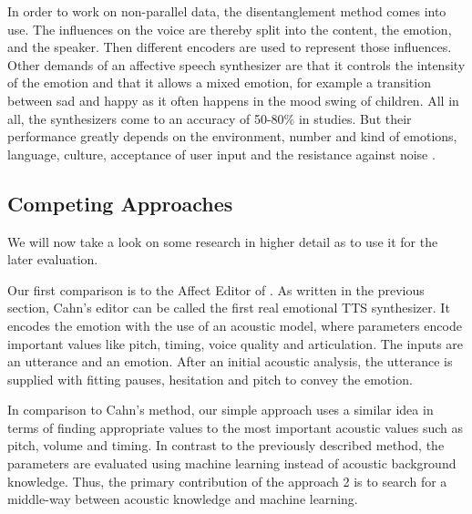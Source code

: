 \documentclass[11pt]{article}
\begin{document}
In order to work on non-parallel data, the disentanglement method comes into use. The influences on the voice are thereby split into the content, the emotion, and the speaker. Then different encoders are used to represent those influences.
Other demands of an affective speech synthesizer are that it controls the intensity of the emotion and that it allows a mixed emotion, for example a transition between sad and happy as it often happens in the mood swing of children. All in all, the synthesizers come to an accuracy of 50-80\% in studies. But their performance greatly depends on the environment, number and kind of emotions, language, culture, acceptance of user input and the resistance against noise \cite{triantafyllopoulos_overview_2023}.


\subsection{Competing Approaches}
\label{competing_approaches}
We will now take a look on some research in higher detail as to use it for the later evaluation. 

Our first comparison is to the Affect Editor of \cite{cahn_generation_2000}. As written in the previous section, Cahn's editor can be called the first real emotional TTS synthesizer. It encodes the emotion with the use of an acoustic model, where parameters encode important values like pitch, timing, voice quality and articulation. The inputs are an utterance and an emotion. After an initial acoustic analysis, the utterance is supplied with fitting pauses, hesitation and pitch to convey the emotion.

In comparison to Cahn's method, our simple approach uses a similar idea in terms of finding appropriate values to the most important acoustic values such as pitch, volume and timing. In contrast to the previously described method, the parameters are evaluated using machine learning instead of acoustic background knowledge. Thus, the primary contribution of the approach 2 is to search for a middle-way between acoustic knowledge and machine learning.
\end{document}

